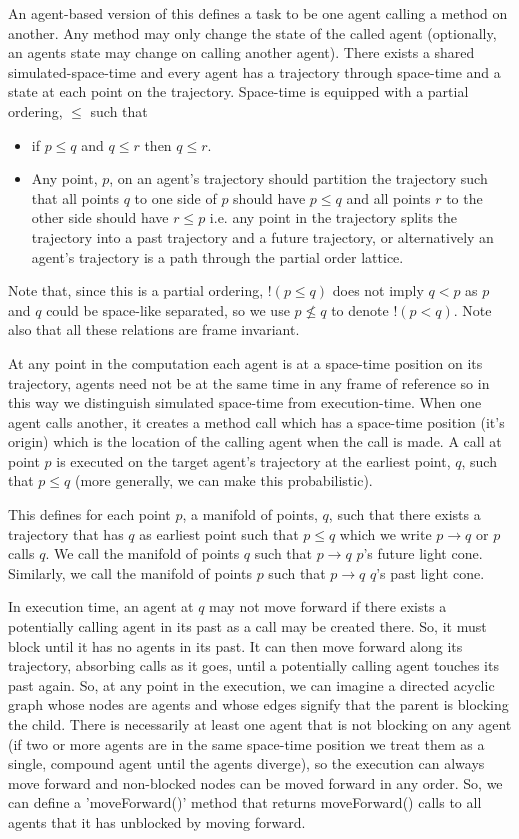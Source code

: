 \documentclass[a4paper]{article}
\begin{document}
An agent-based version of this defines a task to be one agent calling a method on another. Any method may only change the state of the called agent (optionally, an agents state may change on calling another agent). There exists a shared simulated-space-time and every agent has a trajectory through space-time and a state at each point on the trajectory. Space-time is equipped with a partial ordering, $\le$ such that
\begin{itemize}
	\item if $p \le q$ and $q \le r$ then $q \le r$.
	
	\item Any point, $p$, on an agent's trajectory should partition the trajectory such that all points $q$ to one side of $p$ should have $p \le q$ and all points $r$ to the other side should have $r \le p$ i.e. any point in the trajectory splits the trajectory into a past trajectory and a future trajectory, or alternatively an agent's trajectory is a path through the partial order lattice.
	
\end{itemize}
Note that, since this is a partial ordering,  $!(p \le q)$ does not imply $q < p$ as $p$ and $q$ could be space-like separated, so we use $p \nleq q$ to denote $!(p < q)$. Note also that all these relations are frame invariant.

At any point in the computation each agent is at a space-time position on its trajectory, agents need not be at the same time in any frame of reference so in this way we distinguish simulated space-time from execution-time. When one agent calls another, it creates a method call which has a space-time position (it's origin) which is the location of the calling agent when the call is made. A call at point $p$ is executed on the target agent's trajectory at the earliest point, $q$, such that $p \le q$ (more generally, we can make this probabilistic). 

This defines for each point $p$, a manifold of points, $q$, such that there exists a trajectory that has $q$ as earliest point such that $p \le q$ which we write $p \to q$ or $p$ calls $q$. We call the manifold of points $q$ such that $p \to q$ $p$'s future light cone. Similarly, we call the manifold of points $p$ such that $p \to q$ $q$'s past light cone.

In execution time, an agent at $q$ may not move forward if there exists a potentially calling agent in its past as a call may be created there. So, it must block until it has no agents in its past. It can then move forward along its trajectory, absorbing calls as it goes, until a potentially calling agent touches its past again. So, at any point in the execution, we can imagine a directed acyclic graph whose nodes are agents and whose edges signify that the parent is blocking the child. There is necessarily at least one agent that is not blocking on any agent (if two or more agents are in the same space-time position we treat them as a single, compound agent until the agents diverge), so the execution can always move forward and non-blocked nodes can be moved forward in any order. So, we can define a 'moveForward()' method that returns moveForward() calls to all agents that it has unblocked by moving forward.
\end{document}
